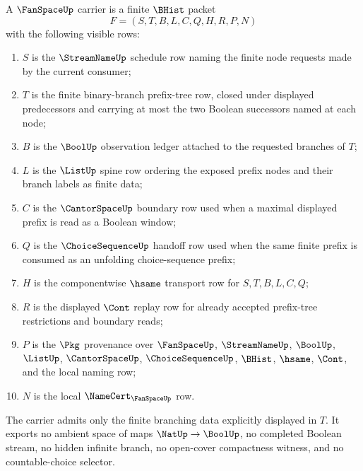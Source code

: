 \begin{definition}
\label{def:fan-space-carrier}
A $\FanSpaceUp$ carrier is a finite $\BHist$ packet
$$
F=(S,T,B,L,C,Q,H,R,P,N)
$$
with the following visible rows:
\begin{enumerate}
\item $S$ is the $\StreamNameUp$ schedule row naming the finite node requests
made by the current consumer;
\item $T$ is the finite binary-branch prefix-tree row, closed under displayed
predecessors and carrying at most the two Boolean successors named at each
node;
\item $B$ is the $\BoolUp$ observation ledger attached to the requested
branches of $T$;
\item $L$ is the $\ListUp$ spine row ordering the exposed prefix nodes and
their branch labels as finite data;
\item $C$ is the $\CantorSpaceUp$ boundary row used when a maximal displayed
prefix is read as a Boolean window;
\item $Q$ is the $\ChoiceSequenceUp$ handoff row used when the same finite
prefix is consumed as an unfolding choice-sequence prefix;
\item $H$ is the componentwise $\hsame$ transport row for $S,T,B,L,C,Q$;
\item $R$ is the displayed $\Cont$ replay row for already accepted prefix-tree
restrictions and boundary reads;
\item $P$ is the $\Pkg$ provenance over $\FanSpaceUp$, $\StreamNameUp$,
$\BoolUp$, $\ListUp$, $\CantorSpaceUp$, $\ChoiceSequenceUp$, $\BHist$,
$\hsame$, $\Cont$, and the local naming row;
\item $N$ is the local $\NameCert_{\FanSpaceUp}$ row.
\end{enumerate}
The carrier admits only the finite branching data explicitly displayed in
$T$. It exports no ambient space of maps $\NatUp \to \BoolUp$, no completed
Boolean stream, no hidden infinite branch, no open-cover compactness witness,
and no countable-choice selector.
\end{definition}

